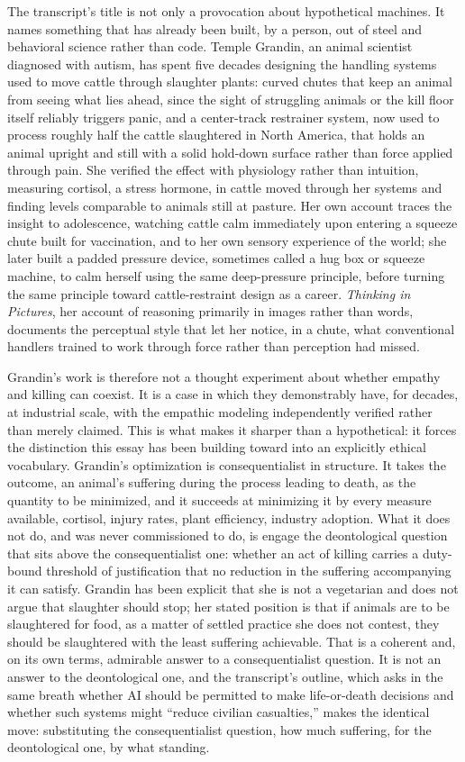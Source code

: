 \documentclass[11pt]{article}
\begin{document}
The transcript's title is not only a provocation about hypothetical machines. It names something that has already been built, by a person, out of steel and behavioral science rather than code. Temple Grandin, an animal scientist diagnosed with autism, has spent five decades designing the handling systems used to move cattle through slaughter plants: curved chutes that keep an animal from seeing what lies ahead, since the sight of struggling animals or the kill floor itself reliably triggers panic, and a center-track restrainer system, now used to process roughly half the cattle slaughtered in North America, that holds an animal upright and still with a solid hold-down surface rather than force applied through pain. She verified the effect with physiology rather than intuition, measuring cortisol, a stress hormone, in cattle moved through her systems and finding levels comparable to animals still at pasture. Her own account traces the insight to adolescence, watching cattle calm immediately upon entering a squeeze chute built for vaccination, and to her own sensory experience of the world; she later built a padded pressure device, sometimes called a hug box or squeeze machine, to calm herself using the same deep-pressure principle, before turning the same principle toward cattle-restraint design as a career. \emph{Thinking in Pictures}, her account of reasoning primarily in images rather than words, documents the perceptual style that let her notice, in a chute, what conventional handlers trained to work through force rather than perception had missed.

Grandin's work is therefore not a thought experiment about whether empathy and killing can coexist. It is a case in which they demonstrably have, for decades, at industrial scale, with the empathic modeling independently verified rather than merely claimed. This is what makes it sharper than a hypothetical: it forces the distinction this essay has been building toward into an explicitly ethical vocabulary. Grandin's optimization is consequentialist in structure. It takes the outcome, an animal's suffering during the process leading to death, as the quantity to be minimized, and it succeeds at minimizing it by every measure available, cortisol, injury rates, plant efficiency, industry adoption. What it does not do, and was never commissioned to do, is engage the deontological question that sits above the consequentialist one: whether an act of killing carries a duty-bound threshold of justification that no reduction in the suffering accompanying it can satisfy. Grandin has been explicit that she is not a vegetarian and does not argue that slaughter should stop; her stated position is that if animals are to be slaughtered for food, as a matter of settled practice she does not contest, they should be slaughtered with the least suffering achievable. That is a coherent and, on its own terms, admirable answer to a consequentialist question. It is not an answer to the deontological one, and the transcript's outline, which asks in the same breath whether AI should be permitted to make life-or-death decisions and whether such systems might ``reduce civilian casualties,'' makes the identical move: substituting the consequentialist question, how much suffering, for the deontological one, by what standing.
\end{document}
